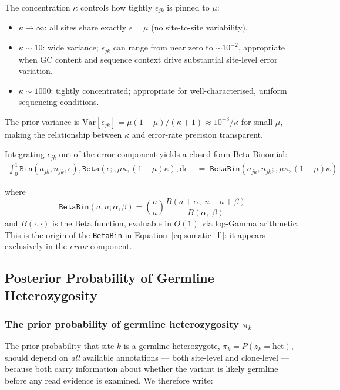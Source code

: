 \documentclass{article}
\begin{document}
The concentration $\kappa$ controls how tightly $\epsilon_{jk}$ is pinned to
$\mu$:
\begin{itemize}
  \item $\kappa \to \infty$: all sites share exactly $\epsilon = \mu$
        (no site-to-site variability).
  \item $\kappa \sim 10$: wide variance; $\epsilon_{jk}$ can range from near
        zero to $\sim 10^{-2}$, appropriate when GC content and sequence context
        drive substantial site-level error variation.
  \item $\kappa \sim 1000$: tightly concentrated; appropriate for
        well-characterised, uniform sequencing conditions.
\end{itemize}

The prior variance is $\mathrm{Var}[\epsilon_{jk}] = \mu(1-\mu)/(\kappa+1)
\approx 10^{-3}/\kappa$ for small $\mu$, making the relationship between
$\kappa$ and error-rate precision transparent.


Integrating $\epsilon_{jk}$ out of the error component yields a closed-form
Beta-Binomial:
\begin{align}
  \int_0^1 \texttt{Bin}(a_{jk},n_{jk},\epsilon),
  \texttt{Beta}(\epsilon;,\mu\kappa,(1{-}\mu)\kappa),\mathrm{d}\epsilon
  &\;=\;
  \texttt{BetaBin}(a_{jk},n_{jk};,\mu\kappa,(1{-}\mu)\kappa)
  \label{eq:bbintegral}
\end{align}

where
\begin{equation}
  \texttt{BetaBin}(a,n;\alpha,\beta) = \binom{n}{a} \frac{B(a + \alpha,\; n - a + \beta)}{B(\alpha,\;\beta)}
\end{equation}
and $B(\cdot,\cdot)$ is the Beta function, evaluable in $O(1)$ via log-Gamma
arithmetic. This is the origin of the \texttt{BetaBin} in
Equation~\eqref{eq:somatic_ll}: it appears exclusively in the \emph{error} component.

\subsection*{Posterior Probability of Germline Heterozygosity}

\subsubsection*{The prior probability of germline heterozygosity $\pi_k$}

The prior probability that site $k$ is a germline heterozygote,
$\pi_k = P(z_k = \mathrm{het})$, should depend on \emph{all} available
annotations --- both site-level and clone-level --- because both carry
information about whether the variant is likely germline before any read
evidence is examined.  We therefore write:
\end{document}
